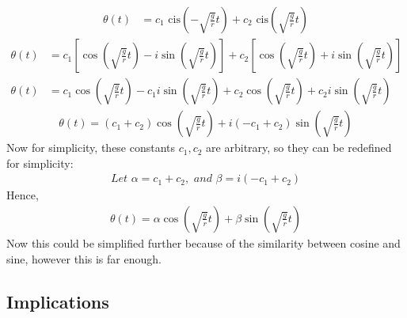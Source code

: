 \documentclass[11pt,a4paper]{article}
\begin{document}
\begin{align}
\theta(t) &= c_1 \text{ cis}  \left(  -\sqrt{\frac{g}{r}} t \right) + c_2 \text{ cis}  \left(  \sqrt{\frac{g}{r}} t \right)
\end{align}
\begin{align}
\theta(t) &=  c_1    \left[     \cos   \left(  \sqrt{\frac{g}{r}} t \right) - i  \sin   \left(  \sqrt{\frac{g}{r}} t \right) \right] + c_2    \left[     \cos   \left(  \sqrt{\frac{g}{r}} t \right) + i  \sin   \left(  \sqrt{\frac{g}{r}} t \right) \right] \\
\theta(t) &= c_1 \cos   \left(  \sqrt{\frac{g}{r}} t \right) - c_1 i  \sin   \left(  \sqrt{\frac{g}{r}} t \right) + c_2 \cos   \left(  \sqrt{\frac{g}{r}} t \right) + c_2 i  \sin   \left(  \sqrt{\frac{g}{r}} t \right)
\end{align}
\begin{align}
\theta(t) = (c_1+c_2) \cos   \left(  \sqrt{\frac{g}{r}} t \right) + i(-c_1+c_2)  \sin   \left(  \sqrt{\frac{g}{r}} t \right)
\end{align}
Now for simplicity,  these constants $c_1,  c_2$ are arbitrary, so they can be redefined for simplicity:
\begin{align}
\textit{Let }\alpha = c_1 + c_2,\textit{ and } \beta = i(-c_1 + c_2)
\end{align}
Hence,
\begin{align}
\theta(t) = \alpha \cos  \left(  \sqrt{\frac{g}{r}} t \right) + \beta \sin  \left(  \sqrt{\frac{g}{r}} t \right)
\end{align}
Now this could be simplified further because of the similarity between cosine and sine,  however this is far enough.

\subsection{Implications}
\end{document}
